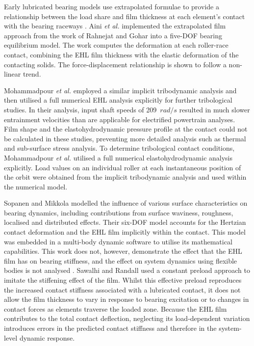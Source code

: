 Early lubricated bearing models use extrapolated formulae to provide a relationship between the load share and film thickness at each element’s contact with the bearing raceways \cite{Rahnejat1985}. Aini \textit{et al.} \cite{Aini2002} implemented the extrapolated film approach from the work of Rahnejat and Gohar \cite{Rahnejat1985} into a five-DOF bearing equilibrium model. The work computes the deformation at each roller-race contact, combining the EHL film thickness with the elastic deformation of the contacting solids. The force-displacement relationship is shown to follow a non-linear trend.

Mohammadpour \textit{et al.} \cite{Mohammadpour2015c} employed a similar implicit tribodynamic analysis and then utilised a full numerical EHL analysis explicitly for further tribological studies. In their analysis, input shaft speeds of 209~$rad/s$ resulted in much slower entrainment velocities than are applicable for electrified powertrain analyses. Film shape and the elastohydrodynamic pressure profile at the contact could not be calculated in these studies, preventing more detailed analysis such as thermal and sub-surface stress analysis. To determine tribological contact conditions, Mohammadpour \textit{et al.} \cite{Mohammadpour2015c} utilised a full numerical elastohydrodynamic analysis explicitly. Load values on an individual roller at each instantaneous position of the orbit were obtained from the implicit tribodynamic analysis and used within the numerical model.

Sopanen and Mikkola \cite{Sopanen2003_1} modelled the influence of various surface characteristics on bearing dynamics, including contributions from surface waviness, roughness, localised and distributed effects. Their six-DOF model accounts for the Hertzian contact deformation and the EHL film implicitly within the contact. This model was embedded in a multi-body dynamic software to utilise its mathematical capabilities. This work does not, however, demonstrate the effect that the EHL film has on bearing stiffness, and the effect on system dynamics using flexible bodies is not analysed \cite{Sopanen2003_2}. Sawalhi and Randall \cite{Sawalhi2008} used a constant preload approach to imitate the stiffening effect of the film. Whilst this effective preload reproduces the increased contact stiffness associated with a lubricated contact, it does not allow the film thickness to vary in response to bearing excitation or to changes in contact forces as elements traverse the loaded zone. Because the EHL film contributes to the total contact deflection, neglecting its load‑dependent variation introduces errors in the predicted contact stiffness and therefore in the system-level dynamic response.

